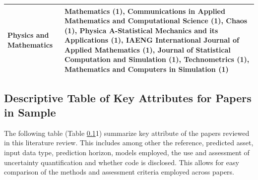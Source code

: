 \begin{table}[H]
\begin{adjustbox}{width=1\textwidth,center}
\begin{tabular}{p{} p{}}
        \addlinespace
        \hdashline[0.2pt/3pt]
        \addlinespace
        Physics and Mathematics & Mathematics (1), Communications in Applied Mathematics and Computational Science (1), Chaos (1), Physica A-Statistical Mechanics and its Applications (1), IAENG International Journal of Applied Mathematics (1), Journal of Statistical Computation and Simulation (1), Technometrics (1), Mathematics and Computers in Simulation (1) \\
        \bottomrule
    \end{tabular}
    \end{adjustbox}
\end{table}




\subsection{Descriptive Table of Key Attributes for Papers in Sample}
\label{appendix:descriptive_table_of_all_articles}

The following table (Table  \ref{appendix:descriptive_table_of_all_articles}1) summarize key attribute of the papers reviewed in this literature review. This includes among other the reference, predicted asset, input data type, prediction horizon, models employed, the use and assessment of uncertainty quantification and whether code is disclosed. This allows for easy comparison of the methods and assessment criteria employed across papers.  

\renewcommand{\thetable}{E\arabic{table}} %
\setcounter{table}{0} %
\scriptsize %
\setlength\LTcapwidth{\textheight} %

